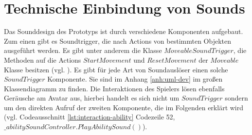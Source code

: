 


\section{Technische Einbindung von Sounds}
Das Sounddesign des Prototyps ist durch verschiedene Komponenten aufgebaut. Zum einen gibt es Soundtrigger, die nach Actions von bestimmten Objekten ausgeführt werden. Es gibt unter anderem die Klasse $MoveableSoundTrigger$, die Methoden auf die Actions $StartMovement$ und $ResetMovement$ der $Moveable$ Klasse besitzen (vgl. ). Es gibt für jede Art von Soundauslöser einen solche $SoundTrigger$ Komponente. Sie sind im Anhang \ref{anh:uml-dev} im großen Klassendiagramm zu finden. Die Interaktionen des Spielers lösen ebenfalls Geräusche am Avatar aus, hierbei handelt es sich nicht um $SoundTrigger$ sondern um den direkten Aufruf der zweiten Komponente, die im Folgenden erklärt wird (vgl. Codeausschnitt \ref{lst:interaction-ability} Codezeile 52, $\_abilitySoundController.PlayAbilitySound()$).

